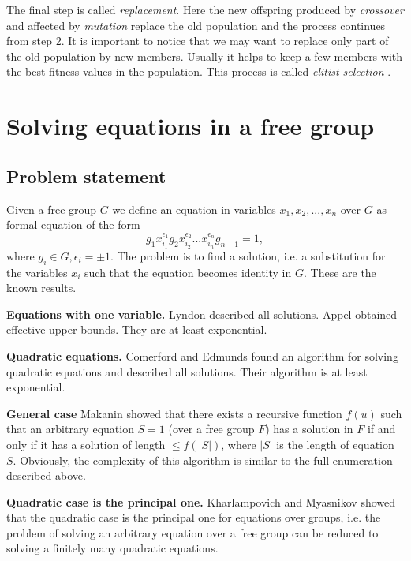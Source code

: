 \documentclass{article}
\begin{document}
The final step is called {\em replacement}. Here the new offspring
produced by {\em crossover} and affected by {\em mutation} replace
the old population and the process continues from step 2. It is
important to notice that we may want to replace only part of the old
population by new members. Usually it helps to keep a few members with
the best fitness values in the population. This process is called {\em
elitist selection }.

\section{Solving equations in a free group}

  \subsection{Problem statement}

Given a free group $G$ we define an equation in variables
$x_1,x_2,...,x_n$ over $G$ as formal equation of the form
\[
g_1 x_{i_1}^{\epsilon_1} g_2 x_{i_2}^{\epsilon_2} ... x_{i_n}^{\epsilon_n} g_{n+1} = 1,
\]
where $g_i \in G, \epsilon_i = \pm 1$. The problem is to find a
solution, i.e. a substitution for the variables $x_i$ such that the
equation becomes identity in $G$. These are the known results.

{\bf Equations with one variable.} Lyndon \cite{Lyndon} described all
solutions. Appel \cite{Appel} obtained effective upper bounds. They
are at least exponential.

{\bf Quadratic equations.} Comerford and Edmunds \cite{C&E:Equations2,
C&E:Equations1} found an algorithm for solving quadratic equations and
described all solutions. Their algorithm is at least exponential.

{\bf General case} Makanin \cite{Makanin} showed that there exists a
recursive function $f(u)$ such that an arbitrary equation $S = 1$
(over a free group $F$) has a solution in $F$ if and only if it has a
solution of length $ \le f(|S|)$, where $|S|$ is the length of
equation $S$. Obviously, the complexity of this algorithm is similar
to the full enumeration described above. 

{\bf Quadratic case is the principal one.} Kharlampovich and Myasnikov
\cite {K&M} showed that the quadratic case is the principal one for
equations over groups, i.e. the problem of solving an arbitrary
equation over a free group can be reduced to solving a finitely many
quadratic equations.
\end{document}
